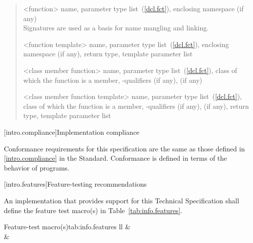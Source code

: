 \begin{quote}
%
<function> name, parameter type list~(\ref{dcl.fct}),  enclosing 
namespace (if any)\\
\enternote Signatures are used as a basis for
name mangling and linking.\exitnote

%
<function template> name, parameter type list~(\ref{dcl.fct}), enclosing namespace (if any),
return type,  template parameter list

%
<class member function> name, parameter type list~(\ref{dcl.fct}), class of which the
function is a member, \cv-qualifiers (if any),
  (if any)

%
<class member function template> name, parameter type list~(\ref{dcl.fct}), class of which the
function is a member, \cv-qualifiers (if any),
 (if any), return type,  template 
parameter list
\end{quote}

[intro.compliance]{Implementation compliance}

\pnum
Conformance requirements for this specification are the same as those 
defined in \ref{intro.compliance} in the \Cpp Standard.
\enternote 
Conformance is defined in terms of the behavior of programs.
\exitnote

[intro.features]{Feature-testing recommendations}

\pnum
An implementation that provides support for this Technical Specification shall 
define the feature test macro(s) in Table~\ref{tab:info.features}.

\renewcommand{\thetable}{\Alph{table}}
\begin{floattable}{Feature-test macro(s)}{tab:info.features}
{ll}
\topline
{} &  \\
\capsep
{}  &       \\
\end{floattable}


